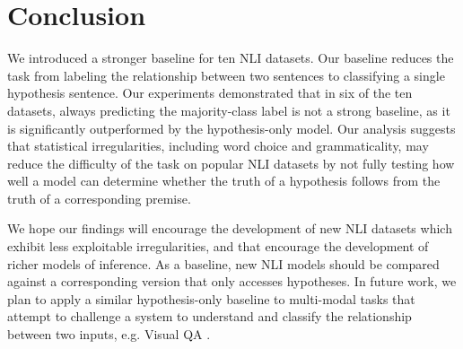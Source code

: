 \section{Conclusion}
We introduced a stronger baseline for ten NLI datasets.  Our baseline reduces the task from labeling the relationship between two sentences to classifying a single hypothesis sentence.  Our experiments demonstrated that in six of the ten datasets, always predicting the majority-class label is not a strong baseline, as it is significantly outperformed by the hypothesis-only model. Our analysis suggests that statistical irregularities, including word choice and grammaticality, may reduce the difficulty of the task on popular NLI datasets by not fully testing how well a model can determine whether the truth of a hypothesis follows from the truth of a corresponding premise.

We hope our findings will encourage the development of new NLI datasets which exhibit less exploitable irregularities, and that encourage the development of richer models of inference. As a baseline, new NLI models should be compared against a corresponding version that only accesses hypotheses. In future work, we plan to apply a similar hypothesis-only baseline to multi-modal tasks that attempt to challenge a system to understand and classify the relationship between two inputs, e.g. Visual QA \cite{antol2015vqa}.


